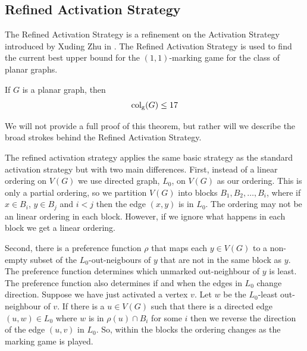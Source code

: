 \subsection{Refined Activation Strategy}\label{sec:refActStrat}
The Refined Activation Strategy is a refinement on the Activation Strategy introduced by Xuding Zhu in \cite{Zhu2008}. The Refined Activation Strategy is used to find the current best upper bound for the $(1,1)$-marking game for the class of planar graphs. 

\begin{theorem}
    If $G$ is a planar graph, then \[\operatorname{col_g}(G)\leq17\]
\end{theorem}

We will not provide a full proof of this theorem, but rather will we describe the broad strokes behind the Refined Activation Strategy.

The refined activation strategy applies the same basic strategy as the standard activation strategy but with two main differences. First, instead of a linear ordering on $V(G)$ we use directed graph, $L_0$, on $V(G)$ as our ordering. This is only a partial ordering, so we partition $V(G)$ into blocks $B_1,B_2,\dots,B_i$, where if $x \in B_i$, $y \in B_j$ and $i < j$ then the edge $(x,y)$ is in $L_0$. The ordering may not be an linear ordering in each block. However, if we ignore what happens in each block we get a linear ordering.

Second, there is a preference function $\rho$ that maps each $y \in V(G)$ to a non-empty subset of the $L_0$-out-neigbours of $y$ that are not in the same block as $y$. The preference function determines which unmarked out-neighbour of $y$ is least. The preference function also determines if and when the edges in $L_0$ change direction. Suppose we have just activated a vertex $v$. Let $w$ be the $L_0$-least out-neighbour of $v$. If there is a $u\in V(G)$ such that there is a directed edge $(u,w)\in L_0$ where $w$ is in $\rho(u)\cap B_i$ for some $i$ then we reverse the direction of the edge $(u,v)$ in $L_0$. So, within the blocks the ordering changes as the marking game is played.

